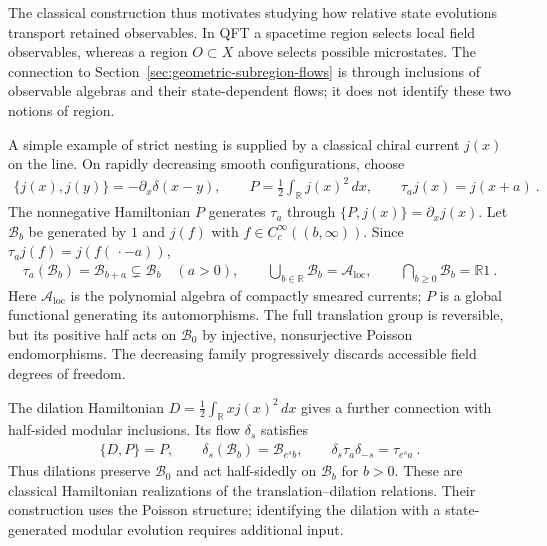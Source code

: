 \documentclass[a4paper,11pt]{article}
\theoremstyle{definition}
\begin{document}
The classical construction thus motivates studying how relative state evolutions transport retained observables. In QFT a spacetime region selects local field observables, whereas a region $O\subset X$ above selects possible microstates. The connection to Section~\ref{sec:geometric-subregion-flows} is through inclusions of observable algebras and their state-dependent flows; it does not identify these two notions of region.


A simple example of strict nesting is supplied by a classical chiral current $j(x)$ on the line. On rapidly decreasing smooth configurations, choose
\begin{align}
    \{j(x),j(y)\}=-\partial_x\delta(x-y),
    \qquad P=\frac12\int_{\mathbb R}j(x)^2\,dx,
    \qquad \tau_a j(x)=j(x+a)\ .
\end{align}
The nonnegative Hamiltonian $P$ generates $\tau_a$ through $\{P,j(x)\}=\partial_xj(x)$. Let $\mathcal B_b$ be generated by $1$ and $j(f)$ with $f\in C_c^\infty((b,\infty))$. Since $\tau_a j(f)=j(f(\,\cdot-a))$,
\begin{align}
    \tau_a(\mathcal B_b)=\mathcal B_{b+a}\subsetneq\mathcal B_b\quad(a>0),
    \qquad
    \bigcup_{b\in\mathbb R}\mathcal B_b=\mathcal A_{\mathrm{loc}},
    \qquad
    \bigcap_{b\geq0}\mathcal B_b=\mathbb R1\ .
\end{align}
Here $\mathcal A_{\mathrm{loc}}$ is the polynomial algebra of compactly smeared currents; $P$ is a global functional generating its automorphisms. The full translation group is reversible, but its positive half acts on $\mathcal B_0$ by injective, nonsurjective Poisson endomorphisms. The decreasing family progressively discards accessible field degrees of freedom.

The dilation Hamiltonian $D=\frac12\int_{\mathbb R}xj(x)^2\,dx$ gives a further connection with half-sided modular inclusions. Its flow $\delta_s$ satisfies
\begin{align}
    \{D,P\}=P,
    \qquad \delta_s(\mathcal B_b)=\mathcal B_{e^s b},
    \qquad \delta_s\tau_a\delta_{-s}=\tau_{e^s a}\ .
\end{align}
Thus dilations preserve $\mathcal B_0$ and act half-sidedly on $\mathcal B_b$ for $b>0$. These are classical Hamiltonian realizations of the translation--dilation relations. Their construction uses the Poisson structure; identifying the dilation with a state-generated modular evolution requires additional input.
\end{document}
